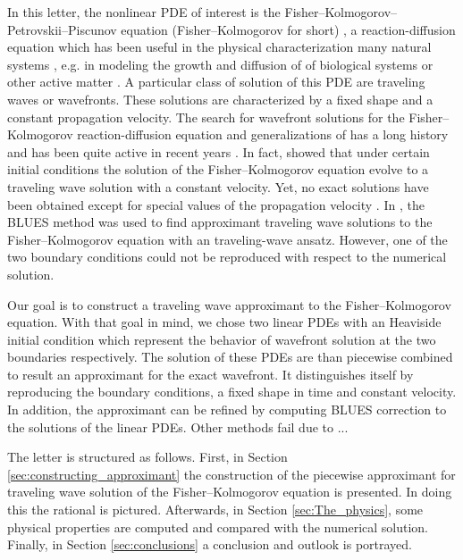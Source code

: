 \documentclass[amsmath,amssymb,amsfonts,aps,pre,preprint,superscriptaddress,bibnotes,showpacs,showkeys,longbibliography]{revtex4-1}
\begin{document}
In this letter, the nonlinear PDE of interest is the Fisher–Kolmogorov–Petrovskii–Piscunov equation (Fisher–Kolmogorov for short) \cite{fisher1937wave, kolmogorov1937study}, a reaction-diffusion equation which has been useful in the physical characterization many natural systems \cite{canosa1973nonlinear,ross2010generalized,hamel2011speedup, gueron1989model, Bewick2017Invasion}, e.g. in modeling the growth and diffusion of of biological systems or other active matter \cite{fisher1937wave}. A particular class of solution of this PDE are traveling waves or wavefronts. These solutions are characterized by a fixed shape and a constant propagation velocity. The search for wavefront solutions for the Fisher–Kolmogorov reaction-diffusion equation and generalizations of has a long history and has been quite active in recent years \cite{Mishra2012,Mansour2010,Yuan2013general}. In fact, \citet{kolmogorov1937study} showed that under certain initial conditions the solution of the Fisher–Kolmogorov equation evolve to a traveling wave solution with a constant velocity. Yet, no exact solutions have been obtained except for special values of the propagation velocity \cite{Ablowitz1979}. In \citet{Berx_2020}, the BLUES method was used to find approximant traveling wave solutions to the Fisher–Kolmogorov equation with an traveling-wave ansatz. However, one of the two boundary conditions could not be reproduced with respect to the numerical solution. %

Our goal is to construct a traveling wave approximant to the Fisher–Kolmogorov equation. With that goal in mind, we chose two linear PDEs with an Heaviside initial condition which represent the behavior of wavefront solution at the two boundaries respectively. The solution of these PDEs are than piecewise combined to result an approximant for the exact wavefront. It distinguishes itself by reproducing the boundary conditions, a fixed shape in time and constant velocity. In addition, the approximant can be refined by computing BLUES correction to the solutions of the linear PDEs. Other methods fail due to {\color{red}...}

The letter is structured as follows. First, in Section \ref{sec:constructing_approximant} the construction of the piecewise approximant for traveling wave solution of the Fisher–Kolmogorov equation is presented. In doing this the rational is pictured. Afterwards, in Section \ref{sec:The_physics}, some physical properties are computed and compared with the numerical solution. Finally, in Section \ref{sec:conclusions} a conclusion and outlook is portrayed.
\end{document}
